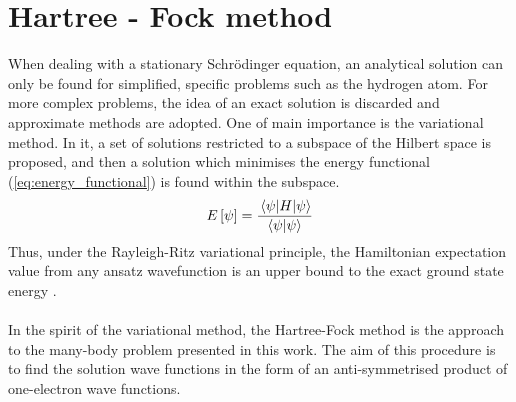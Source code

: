 \section{Hartree - Fock method}
When dealing with a stationary Schrödinger equation, an analytical solution can only be found for simplified, specific problems such as the hydrogen atom. For more complex problems, the idea of an exact solution is discarded and approximate methods are adopted. One of main importance is the variational method. In it, a set of solutions restricted to a subspace of the Hilbert space is proposed, and then a solution which minimises the energy functional (\ref{eq:energy_functional}) is found within the subspace.
\begin{equation}
    E\left[\psi\right] = \frac{\ev{H}{\psi}}{\ip{\psi}}
    \label{eq:energy_functional}
\end{equation}
Thus, under the Rayleigh-Ritz variational principle, the Hamiltonian expectation value from any ansatz wavefunction is an upper bound to the exact ground state energy \cite{griffiths,szabo}.\\\\
In the spirit of the variational method, the Hartree-Fock method is the approach to the many-body problem presented in this work. The aim of this procedure is to find the solution wave functions in the form of an anti-symmetrised product of one-electron wave functions.
